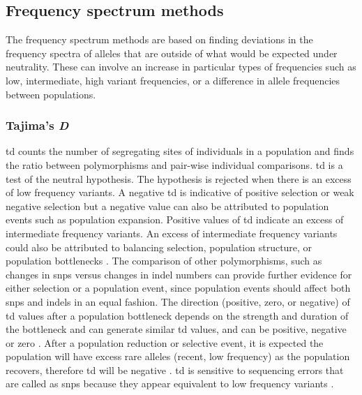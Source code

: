 \documentclass[twoside,openright]{report}
\begin{document}
\subsection{Frequency spectrum
methods}\label{frequency-spectrum-methods}

The frequency spectrum methods are based on finding deviations in the
frequency spectra of alleles that are outside of what would be expected
under neutrality. These can involve an increase in particular types of
frequencies such as low, intermediate, high variant frequencies, or a
difference in allele frequencies between populations.

\subsubsection{\texorpdfstring{Tajima's
\emph{D}}{Tajima's D}}\label{tajimas-d}

\gls{td} \citep{Tajima1989} counts the number of segregating sites of
individuals in a population and finds the ratio between polymorphisms
and pair-wise individual comparisons. \Gls{td} is a test of the neutral
hypothesis. The hypothesis is rejected when there is an excess of low
frequency variants. A negative \gls{td} is indicative of positive
selection or weak negative selection but a negative value can also be
attributed to population events such as population expansion. Positive
values of \gls{td} indicate an excess of intermediate frequency
variants. An excess of intermediate frequency variants could also be
attributed to balancing selection, population structure, or population
bottlenecks \citep{Kreitman2000, Nielsen2005, nielsen2007recent}. The
comparison of other polymorphisms, such as changes in \glspl{snp} versus
changes in \gls{indel} numbers can provide further evidence for either
selection or a population event, since population events should affect
both \glspl{snp} and \glspl{indel} in an equal fashion. The direction
(positive, zero, or negative) of \gls{td} values after a population
bottleneck depends on the strength and duration of the bottleneck and
can generate similar \gls{td} values, and can be positive, negative or
zero \citep{Fay1999}. After a population reduction or selective event,
it is expected the population will have excess rare alleles (recent, low
frequency) as the population recovers, therefore \gls{td} will be
negative \citep{Barton1998}. \Gls{td} is sensitive to sequencing errors
that are called as \glspl{snp} because they appear equivalent to low
frequency variants \citep{Achaz2008}.
\end{document}
